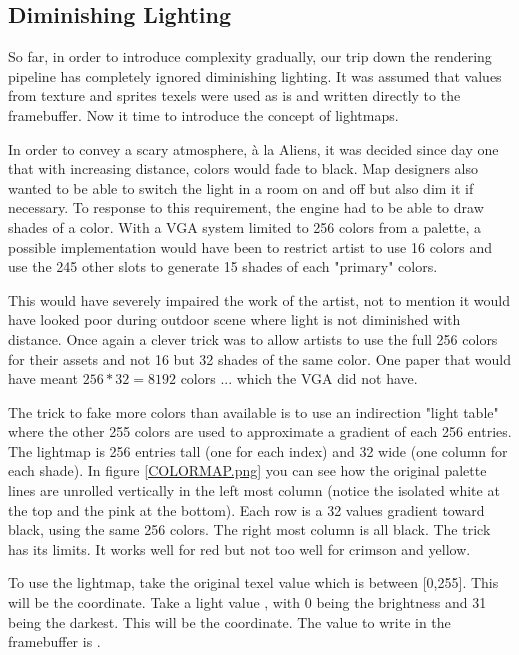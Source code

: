 \subsection{Diminishing Lighting}
\label{diminishedlightning}
\begin{figure}
\centering
{}
\end{figure}
So far, in order to introduce complexity gradually, our trip down the rendering pipeline has completely ignored diminishing lighting. It was assumed that values from texture and sprites texels were used as is and written directly to the framebuffer. Now it time to introduce the concept of lightmaps.\\
\par
In order to convey a scary atmosphere, \`a la Aliens, it was decided since day one that with increasing distance, colors would fade to black. Map designers also wanted to be able to switch the light in a room on and off but also dim it if necessary. To response to this requirement, the engine had to be able to draw shades of a color. With a VGA system limited to 256 colors from a palette, a possible implementation would have been to restrict artist to use 16 colors and use the 245 other slots to generate 15 shades of each "primary" colors.\\
\par
This would have severely impaired the work of the artist, not to mention it would have looked poor during outdoor scene where light is not diminished with distance. Once again a clever trick was to allow artists to use the full 256 colors for their assets and not 16 but 32 shades of the same color. One paper that would have meant $256 * 32 = 8192$ colors ... which the VGA did not have.\\
\par
 The trick to fake more colors than available is to use an indirection "light table" where the other 255 colors are used to approximate a gradient of each 256 entries. The lightmap is 256 entries tall (one for each index) and 32 wide (one column for each shade). In figure \ref{COLORMAP.png} you can see how the original palette lines are unrolled vertically in the left most column (notice the isolated white at the top and the pink at the bottom). Each row is a 32 values gradient toward black, using the same 256 colors. The right most column is all black. The trick has its limits. It works well for red but not too well for crimson and yellow.\\
 \par
 To use the lightmap, take the original texel value  which is between [0,255]. This will be the  coordinate. Take a light value , with 0 being the brightness and 31 being the darkest. This will be the  coordinate. The value to write in the framebuffer is .\\
 \par
{}





